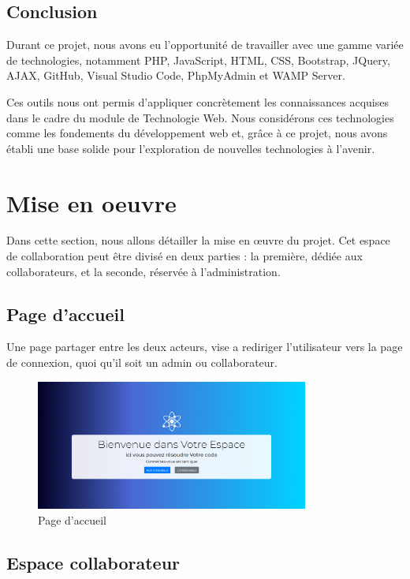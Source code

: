\documentclass{article}
\begin{document}
        \subsection{Conclusion}
            Durant ce projet, nous avons eu l'opportunité de travailler avec une gamme variée de technologies, notamment PHP, JavaScript, HTML, CSS, Bootstrap, JQuery, AJAX, GitHub, Visual Studio Code, PhpMyAdmin et WAMP Server. 

            Ces outils nous ont permis d'appliquer concrètement les connaissances acquises dans le cadre du module de Technologie Web. Nous considérons ces technologies comme les fondements du développement web et, grâce à ce projet, nous avons établi une base solide pour l'exploration de nouvelles technologies à l'avenir.
    
    \section{Mise en oeuvre}
        Dans cette section, nous allons détailler la mise en œuvre du projet. Cet espace de collaboration peut être divisé en deux parties : la première, dédiée aux collaborateurs, et la seconde, réservée à l'administration.
        \subsection{Page d'accueil}
                Une page partager entre les deux acteurs, vise a rediriger l'utilisateur vers la page de connexion, quoi qu'il soit un admin ou collaborateur.
                \begin{figure}[h!]
                    \centering
                    \includegraphics[width=0.8\textwidth]{assets/webSite/homePage.png}
                    \caption{Page d'accueil}
                \end{figure}
                \FloatBarrier
        \subsection{Espace collaborateur}
\end{document}

